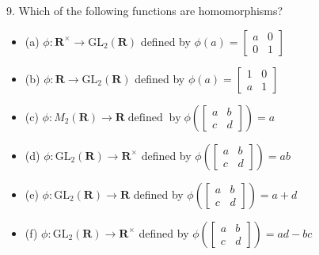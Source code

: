 \begin{mdframed}[style=darkQuesion]
  9. Which of the following functions are homomorphisms?
\begin{itemize}
\item[]{(a) $\phi: \mathbf{R}^{\times} \rightarrow \mathrm{GL}_{2}(\mathbf{R})$ defined by $\phi(a)=\left[\begin{array}{ll}a & 0 \\ 0 & 1\end{array}\right]$}
\item[]{(b) $\phi: \mathbf{R} \rightarrow \mathrm{GL}_{2}(\mathbf{R})$ defined by $\phi(a)=\left[\begin{array}{ll}1 & 0 \\ a & 1\end{array}\right]$}
\item[]{(c) $\phi: M_{2}(\mathbf{R}) \rightarrow \mathbf{R} \operatorname{defined} \operatorname{by} \phi\left(\left[\begin{array}{ll}a & b \\ c & d\end{array}\right]\right)=a$}
\item[]{(d) $\phi: \mathrm{GL}_{2}(\mathbf{R}) \rightarrow \mathbf{R}^{\times}$ defined by $\phi\left(\left[\begin{array}{ll}a & b \\ c & d\end{array}\right]\right)=a b$}
\item[]{(e) $\phi: \mathrm{GL}_{2}(\mathbf{R}) \rightarrow \mathbf{R}$ defined by $\phi\left(\left[\begin{array}{ll}a & b \\ c & d\end{array}\right]\right)=a+d$}
\item[]{(f) $\phi: \mathrm{GL}_{2}(\mathbf{R}) \rightarrow \mathbf{R}^{\times}$ defined by $\phi\left(\left[\begin{array}{ll}a & b \\ c & d\end{array}\right]\right)=a d-b c$}
\end{itemize}
\end{mdframed}
\begin{mdframed}[style=darkAnswer,frametitle={Joe Starr}]
\end{mdframed}
\newpage
